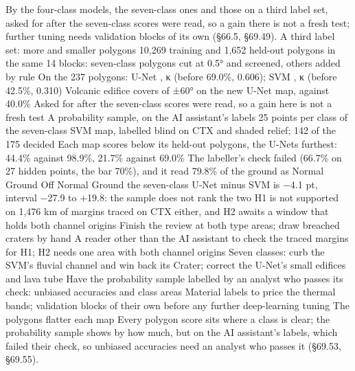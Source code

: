 By the four-class models, the seven-class ones and those on a third label set, asked for after the seven-class scores were read, so a gain there is not a fresh test; further tuning needs validation blocks of its own (§66.5, §69.49).
A third label set: more and smaller polygons
10,269 training and 1,652 held-out polygons in the same 14 blocks: seven-class polygons cut at 0.5° and screened, others added by rule
On the 237 polygons: U-Net , κ  (before 69.0\%, 0.606); SVM , κ  (before 42.5\%, 0.310)
Volcanic edifice covers  of ±60° on the new U-Net map, against 40.0\%
Asked for after the seven-class scores were read, so a gain here is not a fresh test
A probability sample, on the AI assistant's labels
25 points per class of the seven-class SVM map, labelled blind on CTX and shaded relief; 142 of the 175 decided
Each map scores below its held-out polygons, the U-Nets furthest: 44.4\% against 98.9\%, 21.7\% against 69.0\%
The labeller's check failed (66.7\% on 27 hidden points, the bar 70\%), and it read 79.8\% of the ground as Normal Ground
Off Normal Ground the seven-class U-Net minus SVM is −4.1 pt, interval −27.9 to +19.8: the sample does not rank the two
H1 is not supported on 1,476 km of margins traced on CTX either, and H2 awaits a window that holds both channel origins
Finish the review at both type areas; draw breached craters by hand
A reader other than the AI assistant to check the traced margins for H1; H2 needs one area with both channel origins
Seven classes: curb the SVM's fluvial channel and win back its Crater; correct the U-Net's small edifices and lava tube
Have the probability sample labelled by an analyst who passes its check: unbiased accuracies and class areas
Material labels to price the thermal bands; validation blocks of their own before any further deep-learning tuning
The polygons flatter each map
Every polygon score sits where a class is clear; the probability sample shows by how much, but on the AI assistant's labels, which failed their check, so unbiased accuracies need an analyst who passes it (§69.53, §69.55).

